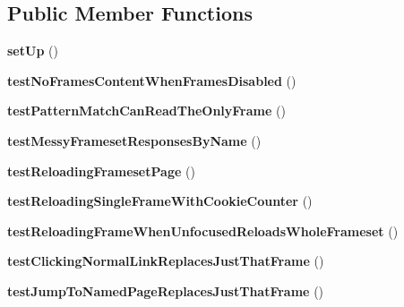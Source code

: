 \subsection*{Public Member Functions}
\begin{DoxyCompactItemize}
\item 
\hypertarget{class_test_of_loading_frames_a34c1843647baad6fc17551401cc9274a}{
{\bfseries setUp} ()}
\label{class_test_of_loading_frames_a34c1843647baad6fc17551401cc9274a}

\item 
\hypertarget{class_test_of_loading_frames_a04a1de583ac314b97a700206b801930d}{
{\bfseries testNoFramesContentWhenFramesDisabled} ()}
\label{class_test_of_loading_frames_a04a1de583ac314b97a700206b801930d}

\item 
\hypertarget{class_test_of_loading_frames_a0a76c29e1adaa716860fed8413f13bc6}{
{\bfseries testPatternMatchCanReadTheOnlyFrame} ()}
\label{class_test_of_loading_frames_a0a76c29e1adaa716860fed8413f13bc6}

\item 
\hypertarget{class_test_of_loading_frames_ae7993c914b18fa76711632d1d1bde2b8}{
{\bfseries testMessyFramesetResponsesByName} ()}
\label{class_test_of_loading_frames_ae7993c914b18fa76711632d1d1bde2b8}

\item 
\hypertarget{class_test_of_loading_frames_a14d528707ec4b542ea749c9810560788}{
{\bfseries testReloadingFramesetPage} ()}
\label{class_test_of_loading_frames_a14d528707ec4b542ea749c9810560788}

\item 
\hypertarget{class_test_of_loading_frames_a112d783ecbf1f4ac4f51ca8fbd4c3364}{
{\bfseries testReloadingSingleFrameWithCookieCounter} ()}
\label{class_test_of_loading_frames_a112d783ecbf1f4ac4f51ca8fbd4c3364}

\item 
\hypertarget{class_test_of_loading_frames_af40c9156298d9a5ba69aa88c5f78779e}{
{\bfseries testReloadingFrameWhenUnfocusedReloadsWholeFrameset} ()}
\label{class_test_of_loading_frames_af40c9156298d9a5ba69aa88c5f78779e}

\item 
\hypertarget{class_test_of_loading_frames_a73e5e24fdac1515dabce933764965662}{
{\bfseries testClickingNormalLinkReplacesJustThatFrame} ()}
\label{class_test_of_loading_frames_a73e5e24fdac1515dabce933764965662}

\item 
\hypertarget{class_test_of_loading_frames_a0a400b55c1e0bc86406199c96657f0bd}{
{\bfseries testJumpToNamedPageReplacesJustThatFrame} ()}
\label{class_test_of_loading_frames_a0a400b55c1e0bc86406199c96657f0bd}


\end{DoxyCompactItemize}
